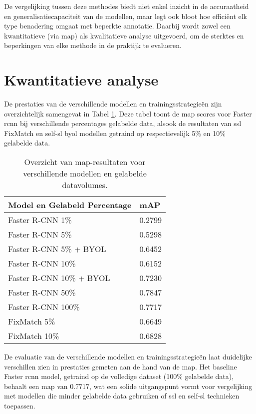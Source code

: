 De vergelijking tussen deze methodes biedt niet enkel inzicht in de accuraatheid en generalisatiecapaciteit van de modellen, maar legt ook bloot hoe efficiënt elk type benadering omgaat met beperkte annotatie. Daarbij wordt zowel een kwantitatieve (via \gls{map}) als kwalitatieve analyse uitgevoerd, om de sterktes en beperkingen van elke methode in de praktijk te evalueren.

\section{Kwantitatieve analyse}

De prestaties van de verschillende modellen en trainingsstrategieën zijn overzichtelijk samengevat in Tabel \ref{tab:map-results}. Deze tabel toont de \gls{map} scores voor Faster \gls{rcnn} bij verschillende percentages gelabelde data, alsook de resultaten van \gls{ssl} FixMatch en \gls{self-sl} \gls{byol} modellen getraind op respectievelijk 5\% en 10\% gelabelde data.

\begin{table}[H]
    \centering
    \begin{tabular}{ll}
        \toprule
        \textbf{Model en Gelabeld Percentage} & \textbf{mAP} \\
        \midrule
        Faster R-CNN 1\%                 & 0.2799 \\
        Faster R-CNN 5\%                 & 0.5298 \\
        Faster R-CNN 5\% + BYOL          & 0.6452 \\
        Faster R-CNN 10\%                & 0.6152 \\
        Faster R-CNN 10\% + BYOL         & 0.7230 \\
        Faster R-CNN 50\%                & 0.7847 \\
        Faster R-CNN 100\%               & 0.7717 \\
        FixMatch 5\%                    & 0.6649 \\
        FixMatch 10\%                   & 0.6828 \\
        \bottomrule
    \end{tabular}
    \caption[Overzicht van mAP-score van verschillende modellen.]{\label{tab:map-results}Overzicht van \gls{map}-resultaten voor verschillende modellen en gelabelde datavolumes.}
\end{table}

De evaluatie van de verschillende modellen en trainingsstrategieën laat duidelijke verschillen zien in prestaties gemeten aan de hand van de \gls{map}. Het baseline Faster \gls{rcnn} model, getraind op de volledige dataset (100\% gelabelde data), behaalt een \gls{map} van 0.7717, wat een solide uitgangspunt vormt voor vergelijking met modellen die minder gelabelde data gebruiken of \gls{ssl} en \gls{self-sl} technieken toepassen. \\

